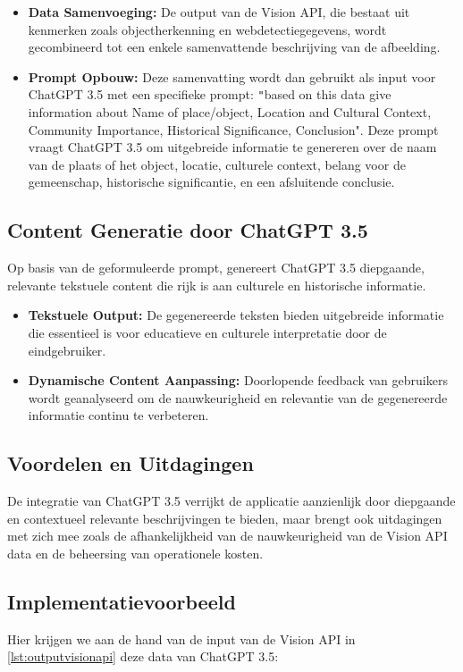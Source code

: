 \begin{itemize}
    \item \textbf{Data Samenvoeging:} De output van de Vision API, die bestaat uit kenmerken zoals objectherkenning en webdetectiegegevens, wordt gecombineerd tot een enkele samenvattende beschrijving van de afbeelding.
    
    \item \textbf{Prompt Opbouw:} Deze samenvatting wordt dan gebruikt als input voor ChatGPT 3.5 met een specifieke prompt: \texttt "based on this data give information about Name of place/object, Location and Cultural Context, Community Importance, Historical Significance, Conclusion". Deze prompt vraagt ChatGPT 3.5 om uitgebreide informatie te genereren over de naam van de plaats of het object, locatie, culturele context, belang voor de gemeenschap, historische significantie, en een afsluitende conclusie.
\end{itemize}

\subsection{Content Generatie door ChatGPT 3.5}
Op basis van de geformuleerde prompt, genereert ChatGPT 3.5 diepgaande, relevante tekstuele content die rijk is aan culturele en historische informatie.

\begin{itemize}
    \item \textbf{Tekstuele Output:} De gegenereerde teksten bieden uitgebreide informatie die essentieel is voor educatieve en culturele interpretatie door de eindgebruiker.
    \item \textbf{Dynamische Content Aanpassing:} Doorlopende feedback van gebruikers wordt geanalyseerd om de nauwkeurigheid en relevantie van de gegenereerde informatie continu te verbeteren.
\end{itemize}

\subsection{Voordelen en Uitdagingen}
De integratie van ChatGPT 3.5 verrijkt de applicatie aanzienlijk door diepgaande en contextueel relevante beschrijvingen te bieden, maar brengt ook uitdagingen met zich mee zoals de afhankelijkheid van de nauwkeurigheid van de Vision API data en de beheersing van operationele kosten.

\subsection{Implementatievoorbeeld}
Hier krijgen we aan de hand van de input van de Vision API in \autoref{lst:outputvisionapi} deze data van ChatGPT 3.5:

